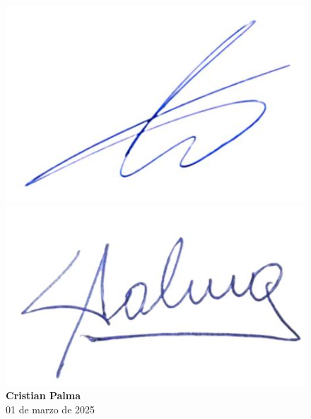 \newcommand{\fechafirma}{\footnotesize 01 de marzo de 2025} 
\begin{figure}[H]
    \centering
    \begin{minipage}[t]{0.22\textwidth}
        \centering
        \includegraphics[width=\textwidth]{../imagenes/firmas/FA.jpg}
        \caption*{\textbf{Federico Alonso}\\\fechafirma}
    \end{minipage}
    \hfill
    \begin{minipage}[t]{0.22\textwidth}
        \centering
        \includegraphics[width=\textwidth]{../imagenes/firmas/CP.jpg}
        \caption*{\textbf{Cristian Palma}\\\fechafirma}
    \end{minipage}
    \hfill
    \begin{minipage}[t]{0.22\textwidth}
        \centering

\end{minipage}
\end{figure}
